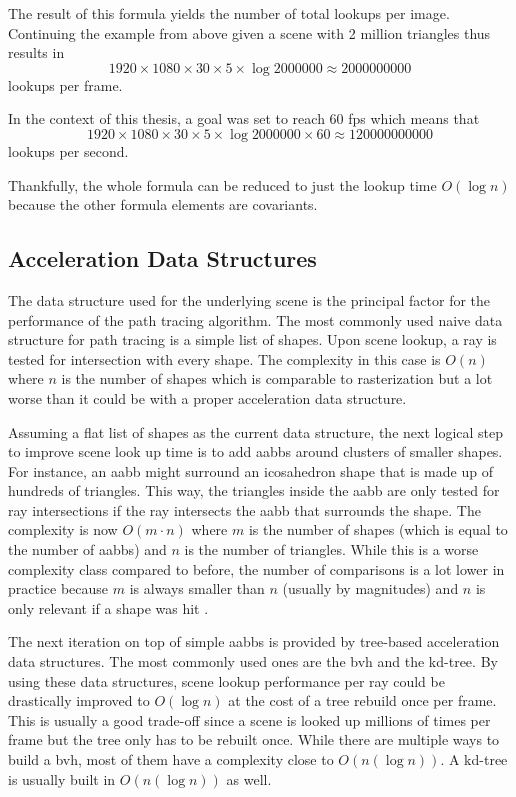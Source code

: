 \documentclass[
  twoside,
  11pt, a4paper,
  footinclude=true,
  headinclude=true,
  cleardoublepage=empty
]{scrreprt}
\begin{document}
The result of this formula yields the number of total lookups per image.
Continuing the example from above given a scene with 2 million triangles thus results in
\[1920 \times 1080 \times 30 \times 5 \times \log \num{2000000} \approx \num{2000000000}\]
lookups per frame.

In the context of this thesis, a goal was set to reach 60 \ac{fps} which means that
\[1920 \times 1080 \times 30 \times 5 \times \log \num{2000000} \times 60 \approx \num{120000000000}\]
lookups per second.

Thankfully, the whole formula can be reduced to just the lookup time \(O(\log n)\) because the other
formula elements are covariants.

\subsection{Acceleration Data Structures}
The data structure used for the underlying scene is the principal factor for the performance of the
path tracing algorithm. The most commonly used naive data structure for path tracing is a simple
list of shapes. Upon scene lookup, a ray is tested for intersection with every shape. The
complexity in this case is \(O(n)\) where \(n\) is the number of shapes which is comparable to rasterization but a lot worse than it
could be with a proper acceleration data structure.

Assuming a flat list of shapes as the current data structure, the next logical step to improve
scene look up time is to add \acp{aabb} around clusters of smaller shapes. For instance, an
\ac{aabb} might surround an icosahedron shape that is made up of hundreds of triangles. This way,
the triangles inside the \ac{aabb} are only tested for ray intersections if the ray intersects the
\ac{aabb} that surrounds the shape. The complexity is now \(O(m \cdot n)\) where \(m\) is the number
of shapes (which is equal to the number of \acp{aabb}) and \(n\) is the number of triangles. While
this is a worse complexity class compared to before, the number of comparisons is a lot lower in
practice because \(m\) is always smaller than \(n\) (usually by magnitudes) and \(n\) is only
relevant if a shape was hit .

The next iteration on top of simple \acp{aabb} is provided by tree-based acceleration data
structures. The most commonly used ones are the \ac{bvh} and the kd-tree. By using these data
structures, scene lookup performance per ray could be drastically improved to \(O(\log n)\) at the
cost of a tree rebuild once per frame. This is usually a good trade-off since a scene is looked up
millions of times per frame but the tree only has to be rebuilt once. While there are multiple
ways to build a \ac{bvh}, most of them have a complexity close to \(O(n(\log n))\). A kd-tree is
usually built in \(O(n(\log n))\) as well.
\end{document}
